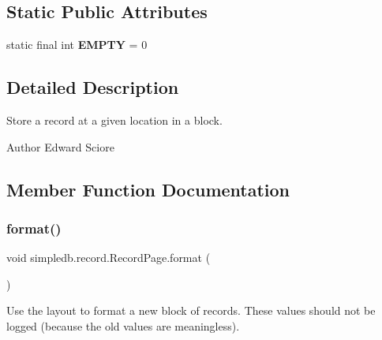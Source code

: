 \subsection*{Static Public Attributes}
\begin{DoxyCompactItemize}
\item 
\mbox{\label{classsimpledb_1_1record_1_1RecordPage_a9bb02cd42375e8ca654ab59f7867d50d}} 
static final int {\bfseries E\+M\+P\+TY} = 0
\end{DoxyCompactItemize}


\subsection{Detailed Description}
Store a record at a given location in a block. \begin{DoxyAuthor}{Author}
Edward Sciore 
\end{DoxyAuthor}


\subsection{Member Function Documentation}
\mbox{\label{classsimpledb_1_1record_1_1RecordPage_a892fe53c31f295c503179004c4a9037d}} 
\subsubsection{\texorpdfstring{format()}{format()}}
{\footnotesize\ttfamily void simpledb.\+record.\+Record\+Page.\+format (\begin{DoxyParamCaption}{ }\end{DoxyParamCaption})\hspace{0.3cm}{\ttfamily [inline]}}

Use the layout to format a new block of records. These values should not be logged (because the old values are meaningless). \mbox{\label{classsimpledb_1_1record_1_1RecordPage_a4ff1955420f4018a6809e88b6008654a}} 
